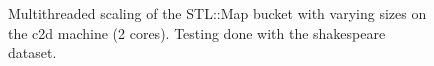 \begin{landscape}
\begin{figure}[H]
{    }
    \label{fig:ts_c2d_shake_map}
    \caption{Multithreaded scaling of the STL::Map bucket with varying sizes on the
    c2d machine (2 cores). Testing done with the shakespeare dataset.}
\end{figure}
\begin{figure}[H]
\end{figure}
\end{landscape}
